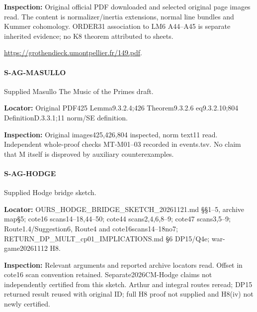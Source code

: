 \documentclass[11pt,a4paper]{article}
\begin{document}
\textbf{Inspection:} Original official PDF downloaded and selected original page images read.\allowbreak{} The content is normalizer/\allowbreak{}inertia extensions, normal line bundles and Kummer cohomology.\allowbreak{} ORDER31 association to LM6 A44–\allowbreak{}A45 is separate inherited evidence; no K8 theorem attributed to sheets.\allowbreak{}

\url{https://grothendieck.umontpellier.fr/149.pdf}.

\paragraph{S-AG-MASULLO} Supplied Masullo The Music of the Primes draft.

\textbf{Locator:} Original PDF425 Lemma9.\allowbreak{}3.\allowbreak{}2.\allowbreak{}4;426 Theorem9.\allowbreak{}3.\allowbreak{}2.\allowbreak{}6 eq9.\allowbreak{}3.\allowbreak{}2.\allowbreak{}10;804 DefinitionD.\allowbreak{}3.\allowbreak{}3.\allowbreak{}1;11 norm/\allowbreak{}SE definition.

\textbf{Inspection:} Original images425,426,804 inspected, norm text11 read.\allowbreak{} Independent whole-proof checks MT-M01–\allowbreak{}03 recorded in events.\allowbreak{}tsv.\allowbreak{} No claim that M itself is disproved by auxiliary counterexamples.\allowbreak{}


\paragraph{S-AG-HODGE} Supplied Hodge bridge sketch.

\textbf{Locator:} OURS\_\allowbreak{}HODGE\_\allowbreak{}BRIDGE\_\allowbreak{}SKETCH\_\allowbreak{}20261121.\allowbreak{}md §§1–\allowbreak{}5, archive map§5; cote16 scans14–\allowbreak{}18,44–\allowbreak{}50; cote44 scans2,4,6,8–\allowbreak{}9; cote47 scans3,5–\allowbreak{}9; Route1.\allowbreak{}4/\allowbreak{}Suggestion6, Route4 and cote16scans14–\allowbreak{}18no7; RETURN\_\allowbreak{}DP\_\allowbreak{}MULT\_\allowbreak{}cp01\_\allowbreak{}IMPLICATIONS.\allowbreak{}md §6 DP15/\allowbreak{}Q4e; war-game20261112 H8.

\textbf{Inspection:} Relevant arguments and reported archive locators read.\allowbreak{} Offset in cote16 scan convention retained.\allowbreak{} Separate2026CM-Hodge claims not independently certified from this sketch.\allowbreak{} Arthur and integral routes reread; DP15 returned result reused with original ID; full H8 proof not supplied and H8(iv) not newly certified.\allowbreak{}
\end{document}
